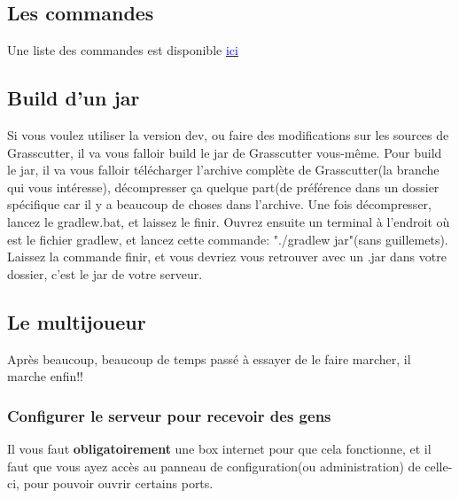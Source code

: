 \documentclass{article}
\begin{document}
\subsection{Les commandes}
Une liste des commandes est disponible \href{https://github.com/Grasscutters/Grasscutter/wiki/Commands}{\textcolor{blue}{ici}}

\subsection{Build d'un jar}
Si vous voulez utiliser la version dev, ou faire des modifications sur les sources de Grasscutter, il va vous falloir build le jar de Grasscutter vous-même.\newline
Pour build le jar, il va vous falloir télécharger l'archive complète de Grasscutter(la branche qui vous intéresse), décompresser ça quelque part(de préférence dans un dossier spécifique car il y a beaucoup de choses dans l'archive.\newline\newline
Une fois décompresser, lancez le gradlew.bat, et laissez le finir.\newline
Ouvrez ensuite un terminal à l'endroit où est le fichier gradlew, et lancez cette commande: "./gradlew jar"(sans guillemets).\newline
Laissez la commande finir, et vous devriez vous retrouver avec un .jar dans votre dossier, c'est le jar de votre serveur.

\subsection{Le multijoueur}
Après beaucoup, beaucoup de temps passé à essayer de le faire marcher, il marche enfin!!

\subsubsection{Configurer le serveur pour recevoir des gens}
Il vous faut \textbf{obligatoirement} une box internet pour que cela fonctionne, et il faut que vous ayez accès au panneau de configuration(ou administration) de celle-ci, pour pouvoir ouvrir certains ports.\newline
\end{document}
